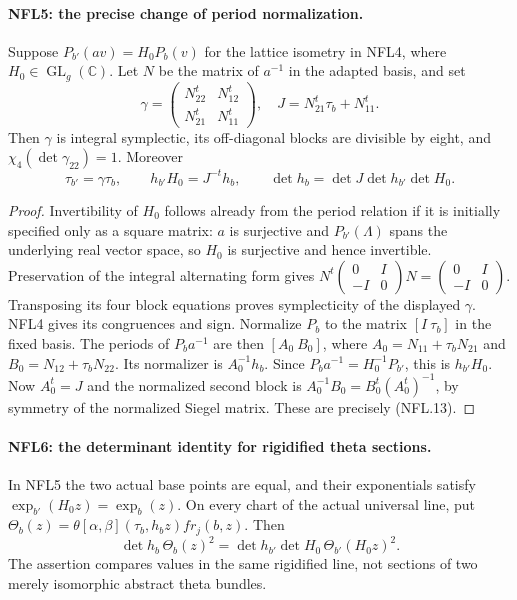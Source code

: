 \paragraph{NFL5: the precise change of period normalization.}
\label{claim:NFL5}
Suppose $P_{b'}(a v)=H_0P_b(v)$ for the lattice isometry in NFL4,
where $H_0\in\operatorname{GL}_g(\mathbb C)$.  Let $N$ be the
matrix of $a^{-1}$ in the adapted basis, and set
\[
 \gamma=\begin{pmatrix}N_{22}^t&N_{12}^t\\N_{21}^t&N_{11}^t\end{pmatrix},
 \quad J=N_{21}^t\tau_b+N_{11}^t.
\]
Then $\gamma$ is integral symplectic, its off-diagonal blocks are
divisible by eight, and $\chi_4(\det\gamma_{22})=1$.  Moreover
\[
 \tau_{b'}=\gamma\tau_b,\qquad
 h_{b'}H_0=J^{-t}h_b,\qquad
 \det h_b=\det J\det h_{b'}\det H_0.
 \tag{NFL.13}
\]

\begin{proof}
Invertibility of $H_0$ follows already from the period relation
if it is initially specified only as a square matrix: $a$ is
surjective and $P_{b'}(\Lambda)$ spans the underlying real
vector space, so $H_0$ is surjective and hence invertible.
Preservation of the integral alternating form gives
$N^t\left(\begin{smallmatrix}0&I\\-I&0\end{smallmatrix}\right)N
=\left(\begin{smallmatrix}0&I\\-I&0\end{smallmatrix}\right)$.
Transposing its four block equations proves symplecticity of
the displayed $\gamma$.  NFL4 gives its congruences and sign.
Normalize $P_b$ to the matrix $[I\ \tau_b]$ in the fixed basis.
The periods of $P_ba^{-1}$ are then
$[A_0\ B_0]$, where
$A_0=N_{11}+\tau_bN_{21}$ and
$B_0=N_{12}+\tau_bN_{22}$.
Its normalizer is $A_0^{-1}h_b$.  Since
$P_ba^{-1}=H_0^{-1}P_{b'}$, this is $h_{b'}H_0$.
Now $A_0^t=J$ and the normalized second block is
$A_0^{-1}B_0=B_0^t(A_0^t)^{-1}$, by symmetry of the normalized
Siegel matrix.  These are precisely (NFL.13).
\end{proof}

\paragraph{NFL6: the determinant identity for rigidified theta sections.}
\label{claim:NFL6}
In NFL5 the two actual base points are equal, and their
exponentials satisfy $\exp_{b'}(H_0z)=\exp_b(z)$.
On every chart of the actual universal line, put
$\Theta_b(z)=\theta[\alpha,\beta](\tau_b,h_bz)fr_j(b,z)$.
Then
\[
 \det h_b\,\Theta_b(z)^2
   =\det h_{b'}\det H_0\,\Theta_{b'}(H_0z)^2.
 \tag{NFL.14}
\]
The assertion compares values in the same rigidified line, not
sections of two merely isomorphic abstract theta bundles.

